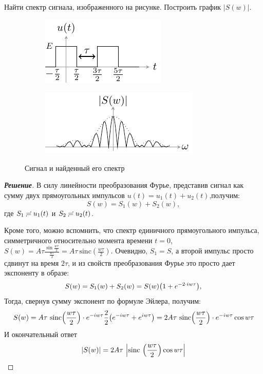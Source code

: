 \begin{task}
	Найти спектр сигнала, изображенного на рисунке. Построить график $|S(w)|$.
\end{task}
\begin{figure}[ht]
  \centering
  \begin{subfigure}[b]{0.5\linewidth}
    \centering\includegraphics[scale=2]{ris/task9_input}
	\label{fig:9}
    \caption{\label{fig:fig9}}
  \end{subfigure}%
  \begin{subfigure}[b]{0.5\linewidth}
    \centering\includegraphics[scale=2]{ris/task9_out}
    \caption{\label{fig:fig9.1}}
    \label{fig:9.1}
  \end{subfigure}%
  \caption{Сигнал  и найденный его спектр }
\end{figure}

\begin{proof}[\rm{\textbf{Решение}}]
В силу линейности преобразования Фурье, представив сигнал как сумму двух прямоугольных импульсов $u(t) = u_1(t)+u_2(t)$,получим:
\begin{equation}
	S(w) = S_1(w) +S_2(w),
\end{equation}
где $S_1 \risingdotseq u_1(t)$ и $S_2 \risingdotseq u_2(t)$.

Кроме того, можно вспомнить, что спектр единичного прямоугольного импульса, симметричного относительно момента времени $t=0$,  $S(w) = A\tau\frac{\sin{\frac{w\tau}{2}}}{\frac{w\tau}{2}} = A\tau ~ \mathrm{sinc}(\frac{w\tau}{2}) $. Очевидно, $S_1=S$, а второй импульс просто сдвинут на время $2\tau$, и из свойств преобразования Фурье это просто дает экспоненту в образе: 
\begin{equation}
	S(w) = S_1(w) +S_2(w) = S(w)\qty(1+e^{-2\cdot iw\tau}),
\end{equation}
Тогда, свернув сумму экспонент по формуле Эйлера, получим:
\begin{equation}
	 {S(w)} = A\tau~\mathrm{sinc}\qty(\frac{w\tau}{2}) \cdot e^{-iw\tau}\frac22\qty(e^{-iw\tau}+e^{iw\tau}) =
	2A\tau~\mathrm{sinc}\qty(\frac{w\tau}{2}) \cdot e^{-iw\tau} \cos{w\tau}
\end{equation}
И окончательный ответ
\begin{equation}
	|S(w)| = 2A\tau~ \abs{\mathrm{sinc}~\qty(\frac{w\tau}{2})  \cos{w\tau}}
\end{equation}

\end{proof}